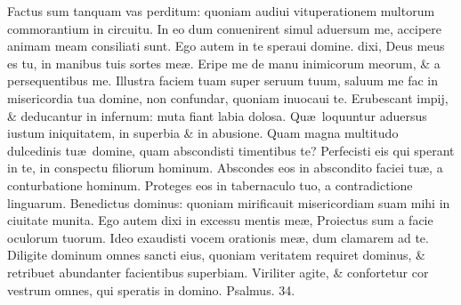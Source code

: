 \documentclass[a5paper,10pt]{book}
\def\ae{æ}
\begin{document}
\begin{multicols*}{2}
\newline \color{red} F\color{black}actus sum tanquam vas perditum: quoniam audiui vituperationem multorum commorantium in circuitu.
\newline \color{red} I\color{black}n eo dum conuenirent simul aduersum me, accipere animam meam consiliati sunt.
\newline \color{red} E\color{black}go autem in te speraui domine. dixi, Deus meus es tu, in manibus tuis sortes me\ae .
\newline \color{red} E\color{black}ripe me de manu inimicorum meorum, \& a persequentibus me.
\newline \color{red} I\color{black}llustra faciem tuam super seruum tuum, saluum me fac in misericordia tua domine, non confundar, quoniam inuocaui te.
\newline \color{red} E\color{black}rubescant impij, \& deducantur in infernum: muta fiant labia dolosa.
\newline \color{red} Q\color{black}u\ae \ loquuntur aduersus iustum iniquitatem, in superbia \& in abusione.
\newline \color{red} Q\color{black}uam magna multitudo dulcedinis tu\ae \ domine, quam abscondisti timentibus te?
\newline \color{red} P\color{black}erfecisti eis qui sperant in te, in conspectu filiorum hominum.
\newline \color{red} A\color{black}bscondes eos in abscondito faciei tu\ae , a conturbatione hominum.
\newline \color{red} P\color{black}roteges eos in tabernaculo tuo, a contradictione linguarum.
\newline \color{red} B\color{black}enedictus dominus: quoniam mirificauit misericordiam suam mihi in ciuitate munita.
\newline \color{red} E\color{black}go autem dixi in excessu mentis me\ae , Proiectus sum a facie oculorum tuorum.
\newline \color{red} I\color{black}deo exaudisti vocem orationis me\ae , dum clamarem ad te.
\newline \color{red} D\color{black}iligite dominum omnes sancti eius, quoniam veritatem requiret dominus, \& retribuet abundanter facientibus superbiam.
\newline \color{red} V\color{black}iriliter agite, \& confortetur cor vestrum omnes, qui speratis in domino.
\newline \color{red} Psalmus. 34. \color{black}
\vspace{-.5em}

\end{multicols*}
\end{document}
